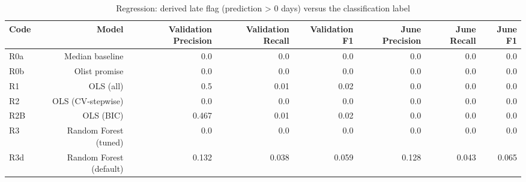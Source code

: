 \begin{table}[htbp]
\centering
\small
\caption{Regression: derived late flag (prediction > 0 days) versus the classification label}
\begin{tabular}{lrrrrrrr}
\toprule
Code & Model & Validation Precision & Validation Recall & Validation F1 & June Precision & June Recall & June F1 \\
\midrule
R0a & Median baseline & 0.0 & 0.0 & 0.0 & 0.0 & 0.0 & 0.0 \\
R0b & Olist promise & 0.0 & 0.0 & 0.0 & 0.0 & 0.0 & 0.0 \\
R1 & OLS (all) & 0.5 & 0.01 & 0.02 & 0.0 & 0.0 & 0.0 \\
R2 & OLS (CV-stepwise) & 0.0 & 0.0 & 0.0 & 0.0 & 0.0 & 0.0 \\
R2B & OLS (BIC) & 0.467 & 0.01 & 0.02 & 0.0 & 0.0 & 0.0 \\
R3 & Random Forest (tuned) & 0.0 & 0.0 & 0.0 & 0.0 & 0.0 & 0.0 \\
R3d & Random Forest (default) & 0.132 & 0.038 & 0.059 & 0.128 & 0.043 & 0.065 \\
\bottomrule
\end{tabular}
\par\smallskip\begin{minipage}{\linewidth}\footnotesize \end{minipage}
\end{table}

